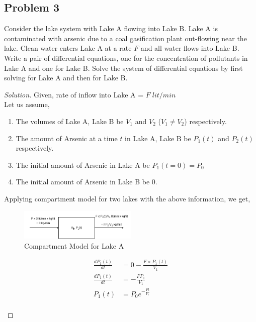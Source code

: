 \documentclass{article}
\newenvironment{solution}
{\renewcommand\qedsymbol{$\blacksquare$}\begin{proof}[Solution]}{\end{proof}}
\begin{document}
\subsection*{Problem 3}
Consider the lake system with Lake A flowing into Lake B. Lake A is contaminated with arsenic
due to a coal gasification plant out-flowing near the lake. Clean water enters Lake A at a rate $F$
and all water flows into Lake B. Write a pair of differential equations, one for the concentration of
pollutants in Lake A and one for Lake B. Solve the system of differential equations by first solving
for Lake A and then for Lake B.
\begin{solution}
Given, rate of inflow into Lake A = $F \; lit/min$ \\
Let us assume,
\begin{enumerate}
	\item The volumes of Lake A, Lake B be $V_1$ and $V_2$ ($V_1 \ne V_2$) respectively.
	\item The amount of Arsenic at a time $t$ in Lake A, Lake B be $P_1(t)$ and $P_2(t)$ respectively.
	\item The initial amount of Arsenic in Lake A be $P_1(t=0) = P_0$
	\item The initial amount of Arsenic in Lake B be $0$.
\end{enumerate}
Applying compartment model for two lakes with the above information, we get,

\begin{multicols}{2}

\begin{figure}[H]
\caption{Compartment Model for Lake A}
\centering
\includegraphics[width=0.5\textwidth]{"Problem3 - Left Compartment"}
\end{figure}
\vspace*{\fill}
\begin{equation}
\begin{split}
\frac{dP_1(t)}{dt} &= 0 - \frac{F \times P_1(t)}{V_1}\\
\frac{dP_1(t)}{dt} &= -\frac{FP_1}{V_1}\\
P_1(t) &= P_0e^{-\frac{Ft}{V_1}}\\
\end{split}
\end{equation}
\vspace*{\fill}


\end{multicols}
\end{solution}
\end{document}

